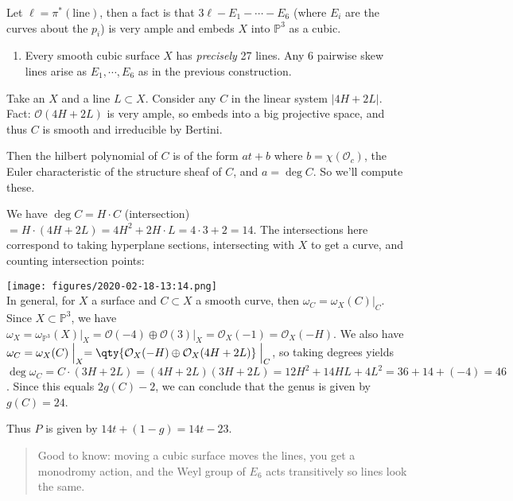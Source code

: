 Let \(\ell = \pi^*(\text{line})\), then a fact is that
\(3\ell - E_1 -\cdots - E_6\) (where \(E_i\) are the curves about the
\(p_i\)) is very ample and embeds \(X\) into \({\mathbb{P}}^3\) as a
cubic.

\begin{enumerate}
\def\labelenumi{\arabic{enumi}.}
\setcounter{enumi}{1}
\tightlist
\item
  Every smooth cubic surface \(X\) has \emph{precisely} 27 lines. Any 6
  pairwise skew lines arise as \(E_1, \cdots, E_6\) as in the previous
  construction.
\end{enumerate}

Take an \(X\) and a line \(L\subset X\). Consider any \(C\) in the
linear system \({\left\lvert {4H + 2L} \right\rvert}\). Fact:
\({\mathcal{O}}(4H + 2L)\) is very ample, so embeds into a big
projective space, and thus \(C\) is smooth and irreducible by Bertini.

Then the hilbert polynomial of \(C\) is of the form \(at + b\) where
\(b = \chi({\mathcal{O}}_c)\), the Euler characteristic of the structure
sheaf of \(C\), and \(a = \deg C\). So we'll compute these.

We have \(\deg C = H \cdot C\) (intersection)
\(= H \cdot(4H + 2L) = 4H^2 + 2H\cdot L = 4\cdot 3 + 2 = 14\). The
intersections here correspond to taking hyperplane sections,
intersecting with \(X\) to get a curve, and counting intersection
points:

\texttt{[image: figures/2020-02-18-13:14.png]}\\

In general, for \(X\) a surface and \(C\subset X\) a smooth curve, then
\(\omega_C = \omega_X(C)\mathrel{\Big|}_C\). Since
\(X\subset {\mathbb{P}}^3\), we have
\(\omega_X = \omega_{{\mathbb{P}}^3}(X) \mathrel{\Big|}_X = {\mathcal{O}}(-4) \oplus {\mathcal{O}}(3)\mathrel{\Big|}_X = {\mathcal{O}}_X(-1) = {\mathcal{O}}_X(-H)\).
We also have
\(\omega_C = \omega_X(C)\mathrel{\Big|}_X = \qty{ {\mathcal{O}}_X(-H) \oplus {\mathcal{O}}_X(4H + 2L) }\mathrel{\Big|}_C\),
so taking degrees yields
\(\deg \omega_C = C\cdot(3H + 2L) = (4H+2L)(3H+2L) = 12H^2 + 14HL + 4L^2 = 36 + 14 + (-4) = 46\).
Since this equals \(2g(C) - 2\), we can conclude that the genus is given
by \(g(C) = 24\).

Thus \(P\) is given by \(14t + (1-g) = 14t - 23\).

\begin{quote}
Good to know: moving a cubic surface moves the lines, you get a
monodromy action, and the Weyl group of \(E_6\) acts transitively so
lines look the same.
\end{quote}

